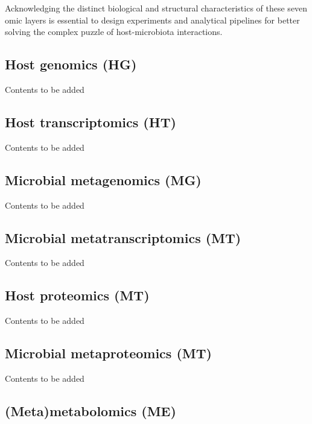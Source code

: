 \documentclass[
]{article}
\begin{document}
Acknowledging the distinct biological and structural characteristics of these seven omic layers is essential to design experiments and analytical pipelines for better solving the complex puzzle of host-microbiota interactions.

\hypertarget{host-genomics}{%
\subsection{Host genomics (HG)}\label{host-genomics}}

Contents to be added

\hypertarget{host-transcriptomics}{%
\subsection{Host transcriptomics (HT)}\label{host-transcriptomics}}

Contents to be added

\hypertarget{microbial-metagenomics}{%
\subsection{Microbial metagenomics (MG)}\label{microbial-metagenomics}}

Contents to be added

\hypertarget{microbial-metatranscriptomics}{%
\subsection{Microbial metatranscriptomics (MT)}\label{microbial-metatranscriptomics}}

Contents to be added

\hypertarget{host-proteomics}{%
\subsection{Host proteomics (MT)}\label{host-proteomics}}

Contents to be added

\hypertarget{microbial-metaproteomics}{%
\subsection{Microbial metaproteomics (MT)}\label{microbial-metaproteomics}}

Contents to be added

\hypertarget{meta-metabolomics}{%
\subsection{(Meta)metabolomics (ME)}\label{meta-metabolomics}}
\end{document}
